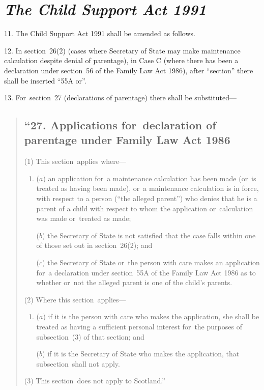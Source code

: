 \documentclass[12pt,a4paper]{article}
\begin{document}
\section*{\itshape The Child Support Act 1991}

11. The Child Support Act 1991 shall be amended as follows.

\medskip

12. In section~26(2)  (cases where Secretary of State may make maintenance calculation despite denial of parentage), in Case C (where there has been a declaration under section~56 of the Family Law Act 1986), after “section” there shall be inserted “55A or”.

\medskip

13. For~section~27 (declarations of parentage) there shall be substituted—
\begin{quotation}
\subsection*{“27. Applications for~declaration of parentage under Family Law Act 1986}

(1) This section~applies where—
\begin{enumerate}\item[]
($a$) an application for~a maintenance calculation has been made (or~is treated as having been made), or~a maintenance calculation is in force, with respect to a person (“the alleged parent”) who denies that he is a parent of a child with respect to whom the application or~calculation was made or~treated as made;

($b$) the Secretary of State is not satisfied that the case falls within one of those set out in section~26(2); and

($c$) the Secretary of State or~the person with care makes an application for~a declaration under section~55A of the Family Law Act 1986 as to whether or~not the alleged parent is one of the child’s parents.
\end{enumerate}

(2) Where this section~applies—
\begin{enumerate}\item[]
($a$) if it is the person with care who makes the application, she shall be treated as having a sufficient personal interest for~the purposes of subsection~(3)  of that section; and

($b$) if it is the Secretary of State who makes the application, that subsection~shall not apply.
\end{enumerate}

(3) This section~does not apply to Scotland.”
\end{quotation}
\end{document}
